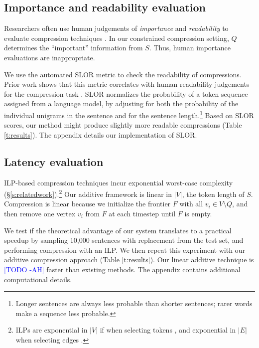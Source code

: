 \documentclass[11pt,a4paper]{article}
\newcommand{\ahcomment}[1]{\textcolor{blue}{[#1 -AH]}}
\begin{document}
\subsection{Importance and readability evaluation}\label{s:readabilityinformativeness}

Researchers often use human judgements of \textit{importance} and \textit{readability} to evaluate compression techniques \cite{Knight2000StatisticsBasedS,clarke2008global,filippova2015sentence}. In our constrained compression setting, $Q$ determines the ``important'' information from $S$. Thus, human importance evaluations are inappropriate.

We use the automated SLOR metric \cite{lau2015unsupervised} to check the readability of compressions. Prior work shows that this metric correlates with human readability judgements for the compression task \cite{kannConl}. SLOR normalizes the probability of a token sequence assigned from a language model, by adjusting for both the probability of the individual unigrams in the sentence and for the sentence length.\footnote{Longer sentences are always less probable than shorter sentences; rarer words make a sequence less probable.} Based on SLOR scores, our method might produce slightly more readable compressions (Table \ref{t:results}). The appendix details our implementation of SLOR. 

\subsection{Latency evaluation}\label{s:costs}

ILP-based compression techniques incur exponential worst-case complexity (\S\ref{s:relatedwork}).\footnote{ILPs are exponential in $|V|$ if when selecting tokens \cite{clarke2008global}, and exponential in $|E|$ when selecting edges \cite{filippova2013overcoming}.} Our additive framework is linear in $|V|$, the token length of $S$. Compression is linear because we initialize the frontier $F$ with all $v_i \in V \setminus Q$, and then remove one vertex $v_i$ from $F$ at each timestep until $F$ is empty.

We test if the theoretical advantage of our system translates to a practical speedup by sampling 10,000 sentences with replacement from the test set, and performing compression with an ILP. We then repeat this experiment with our additive compression approach (Table \ref{t:results}). Our linear additive technique is \ahcomment{TODO} faster than existing methods. The appendix contains additional computational details.
\end{document}
